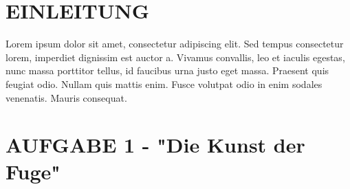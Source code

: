 \documentclass[a4paper,12pt]{article}
\begin{document}
\thispagestyle{empty}
\tableofcontents	


\setcounter{page}{2}


\newpage
\section{EINLEITUNG}



Lorem ipsum dolor sit amet, consectetur adipiscing elit. Sed tempus consectetur lorem, imperdiet dignissim est auctor a. Vivamus convallis, leo et iaculis egestas, nunc massa porttitor tellus, id faucibus urna justo eget massa. Praesent quis feugiat odio. Nullam quis mattis enim. Fusce volutpat odio in enim sodales venenatis. Mauris consequat.


\newpage
\section{AUFGABE 1 - "Die Kunst der Fuge"}
\end{document}
